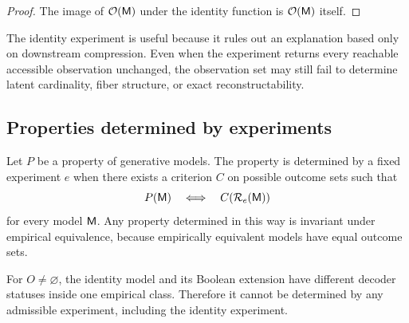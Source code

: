 \begin{proof}
The image of \(\mathcal O(\mathsf M)\) under the identity function is \(\mathcal O(\mathsf M)\) itself.
\end{proof}
The identity experiment is useful because it rules out an explanation based only on downstream compression. Even when the experiment returns every reachable accessible observation unchanged, the observation set may still fail to determine latent cardinality, fiber structure, or exact reconstructability.

\subsection{Properties determined by experiments}

Let \(P\) be a property of generative models. The property is determined by a fixed experiment \(e\) when there exists a criterion \(C\) on possible outcome sets such that
\[
P(\mathsf M)
\quad\Longleftrightarrow\quad
C(\mathcal R_e(\mathsf M))
\]
for every model \(\mathsf M\). Any property determined in this way is invariant under empirical equivalence, because empirically equivalent models have equal outcome sets.

For \(O\neq\varnothing\), the identity model and its Boolean extension have different decoder statuses inside one empirical class. Therefore it cannot be determined by any admissible experiment, including the identity experiment.
